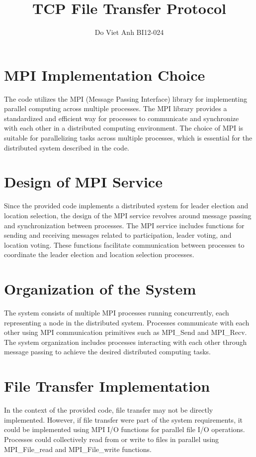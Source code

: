 \documentclass{article}
\title{TCP File Transfer Protocol}
\author{Do Viet Anh BI12-024}
\begin{document}
\maketitle

\section{MPI Implementation Choice}
The code utilizes the MPI (Message Passing Interface) library for implementing parallel computing across multiple processes. The MPI library provides a standardized and efficient way for processes to communicate and synchronize with each other in a distributed computing environment. The choice of MPI is suitable for parallelizing tasks across multiple processes, which is essential for the distributed system described in the code.

\section{Design of MPI Service}
Since the provided code implements a distributed system for leader election and location selection, the design of the MPI service revolves around message passing and synchronization between processes. The MPI service includes functions for sending and receiving messages related to participation, leader voting, and location voting. These functions facilitate communication between processes to coordinate the leader election and location selection processes.

\section{Organization of the System}
The system consists of multiple MPI processes running concurrently, each representing a node in the distributed system. Processes communicate with each other using MPI communication primitives such as MPI\_Send and MPI\_Recv. The system organization includes processes interacting with each other through message passing to achieve the desired distributed computing tasks.

\section{File Transfer Implementation}
In the context of the provided code, file transfer may not be directly implemented. However, if file transfer were part of the system requirements, it could be implemented using MPI I/O functions for parallel file I/O operations. Processes could collectively read from or write to files in parallel using MPI\_File\_read and MPI\_File\_write functions.
\end{document}
